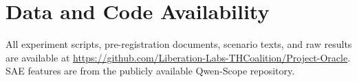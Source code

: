 \documentclass[11pt,a4paper]{article}
\begin{document}
\section*{Data and Code Availability}

All experiment scripts, pre-registration documents, scenario texts, and raw
results are available at
\url{https://github.com/Liberation-Labs-THCoalition/Project-Oracle}.
SAE features are from the publicly available Qwen-Scope repository.




\end{document}
